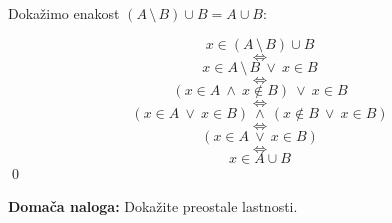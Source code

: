 \documentclass[12pt,a4paper]{article}
\def\ali {{~\vee~}}
\def\inn {{~\wedge~}}
\def\brez {{\,\setminus\,}}
\def\cee {{~\Leftrightarrow~}}
\begin{document}
Dokažimo enakost $(A\brez B)\cup B = A\cup B$:

$$x\in (A\brez B)\cup B$$
$$\cee$$
$$x\in A\brez B \ali x\in B$$
$$\cee$$
$$(x\in A\inn x\not\in B) \ali x\in B$$
$$\cee$$
$$(x\in A\ali x\in B) \inn (x\not\in B \ali x\in B)$$
$$\cee$$
$$(x\in A\ali x\in B)$$
$$\cee$$
$$x\in A\cup B$$
\qed

\bigskip
{\bf Domača naloga:} Dokažite preostale lastnosti.

\bigskip
\end{document}
